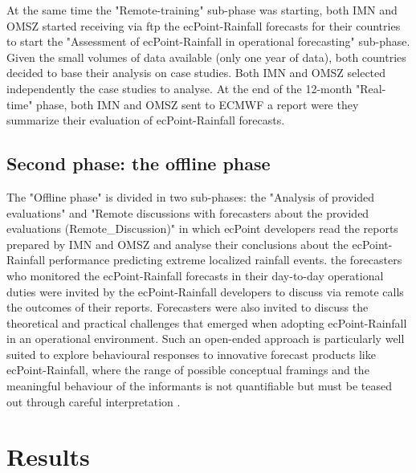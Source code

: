 \documentclass[twocol]{ametsocV5} %
\begin{document}
At the same time the "Remote-training" sub-phase was starting, both IMN and OMSZ started receiving via ftp the ecPoint-Rainfall forecasts for their countries to start the "Assessment of ecPoint-Rainfall in operational forecasting" sub-phase. Given the small volumes of data available (only one year of data), both countries decided to base their analysis on case studies. Both IMN and OMSZ selected independently the case studies to analyse. At the end of the 12-month "Real-time" phase, both IMN and OMSZ sent to ECMWF a report were they summarize their evaluation of ecPoint-Rainfall forecasts.
	
\subsection{Second phase: the offline phase}
The "Offline phase" is divided in two sub-phases: the "Analysis of provided evaluations" and "Remote discussions with forecasters about the provided evaluations (Remote\_Discussion)" in which ecPoint developers read the reports prepared by IMN and OMSZ and analyse their conclusions about the ecPoint-Rainfall performance predicting extreme localized rainfall events.  the forecasters who monitored the ecPoint-Rainfall forecasts in their day-to-day operational duties were invited by the ecPoint-Rainfall developers to discuss via remote calls the outcomes of their reports. Forecasters were also invited to discuss the theoretical and practical challenges that emerged when adopting ecPoint-Rainfall in an operational environment. Such an open-ended approach is particularly well suited to explore behavioural responses to innovative forecast products like ecPoint-Rainfall, where the range of possible conceptual framings and the meaningful behaviour of the informants is not quantifiable but must be teased out through careful interpretation \citep{Patton2002}.	


\section{Results}
\end{document}
